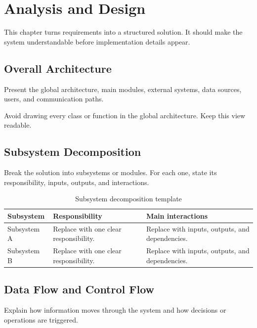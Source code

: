 \chapter{Analysis and Design}
\label{chap:analysis-design}

This chapter turns requirements into a structured solution. It should make the system understandable before implementation details appear.

\section{Overall Architecture}
Present the global architecture, main modules, external systems, data sources, users, and communication paths.


Avoid drawing every class or function in the global architecture. Keep this view readable.

\section{Subsystem Decomposition}
Break the solution into subsystems or modules. For each one, state its responsibility, inputs, outputs, and interactions.

\begin{table}[H]
    \centering
    \caption{Subsystem decomposition template}
    \label{tab:subsystem-decomposition-template}
    \small
    \begin{tabular}{L{0.22\textwidth}L{0.28\textwidth}L{0.36\textwidth}}
        \toprule
        \textbf{Subsystem} & \textbf{Responsibility} & \textbf{Main interactions} \\
        \midrule
        Subsystem A & Replace with one clear responsibility. & Replace with inputs, outputs, and dependencies. \\
        \tabrowsep
        Subsystem B & Replace with one clear responsibility. & Replace with inputs, outputs, and dependencies. \\
        \bottomrule
    \end{tabular}
\end{table}

\section{Data Flow and Control Flow}
Explain how information moves through the system and how decisions or operations are triggered.

